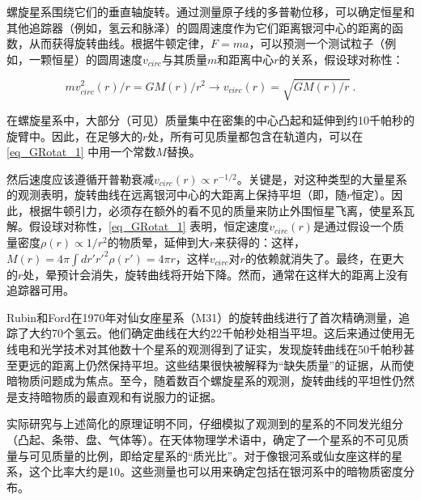 
螺旋星系围绕它们的垂直轴旋转。通过测量原子线的多普勒位移，可以确定恒星和其他追踪器（例如，氢云和脉泽）的圆周速度作为它们距离银河中心的距离的函数，从而获得旋转曲线。根据牛顿定律，$F = ma$，可以预测一个测试粒子（例如，一颗恒星）的圆周速度$v_{circ}$与其质量$m$和距离中心$r$的关系，假设球对称性：

\begin{equation}\label{eq_GRotat_1}
mv^2_{circ}(r) / r = GM(r) / r^2 \rightarrow v_{circ}(r) = \sqrt{GM(r) / r} ~.
\end{equation}


在螺旋星系中，大部分（可见）质量集中在密集的中心凸起和延伸到约10千帕秒的旋臂中。因此，在足够大的$r$处，所有可见质量都包含在轨道内，可以在\autoref{eq_GRotat_1} 中用一个常数$M$替换。

然后速度应该遵循开普勒衰减$v_{circ}(r) \propto r^{-1/2}$。关键是，对这种类型的大量星系的观测表明，旋转曲线在远离银河中心的大距离上保持平坦（即，随$r$恒定）。因此，根据牛顿引力，必须存在额外的看不见的质量来防止外围恒星飞离，使星系瓦解。假设球对称性，\autoref{eq_GRotat_1} 表明，恒定速度$v_{circ}(r)$是通过假设一个质量密度$\rho(r) \propto 1/r^2$的物质晕，延伸到大$r$来获得的：这样，$M(r) = 4 \pi \int dr' r'^2 \rho(r') = 4\pi r$，这样$v_{circ}$对$r$的依赖就消失了。最终，在更大的$r$处，晕预计会消失，旋转曲线将开始下降。然而，通常在这样大的距离上没有追踪器可用。

Rubin和Ford在1970年对仙女座星系（M31）的旋转曲线进行了首次精确测量，追踪了大约70个氢云。他们确定曲线在大约22千帕秒处相当平坦。这后来通过使用无线电和光学技术对其他数十个星系的观测得到了证实，发现旋转曲线在50千帕秒甚至更远的距离上仍然保持平坦。这些结果很快被解释为“缺失质量”的证据，从而使暗物质问题成为焦点。至今，随着数百个螺旋星系的观测，旋转曲线的平坦性仍然是支持暗物质的最直观和有说服力的证据。

实际研究与上述简化的原理证明不同，仔细模拟了观测到的星系的不同发光组分（凸起、条带、盘、气体等）。在天体物理学术语中，确定了一个星系的不可见质量与可见质量的比例，即给定星系的“质光比”。对于像银河系或仙女座这样的星系，这个比率大约是10。这些测量也可以用来确定包括在银河系中的暗物质密度分布。